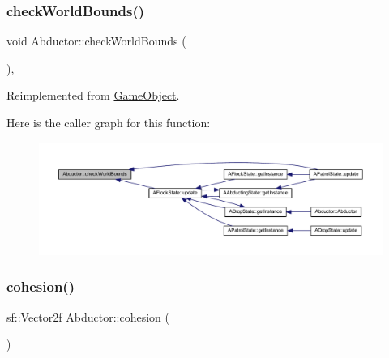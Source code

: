 \subsubsection{\texorpdfstring{check\+World\+Bounds()}{checkWorldBounds()}}
{\footnotesize\ttfamily void Abductor\+::check\+World\+Bounds (\begin{DoxyParamCaption}{ }\end{DoxyParamCaption})\hspace{0.3cm}{\ttfamily [override]}, {\ttfamily [virtual]}}



Reimplemented from \hyperlink{class_game_object_a07bcaf0d87bd507f0a6e98abebd70e53}{Game\+Object}.

Here is the caller graph for this function\+:
\nopagebreak
\begin{figure}[H]
\begin{center}
\leavevmode
\includegraphics[width=350pt]{class_abductor_a4b86fdcd63a060c53da22f092a113b24_icgraph}
\end{center}
\end{figure}
\mbox{\label{class_abductor_ad1660967efd5c4abcdee49989a966722}} 
\subsubsection{\texorpdfstring{cohesion()}{cohesion()}}
{\footnotesize\ttfamily sf\+::\+Vector2f Abductor\+::cohesion (\begin{DoxyParamCaption}{ }\end{DoxyParamCaption})}

